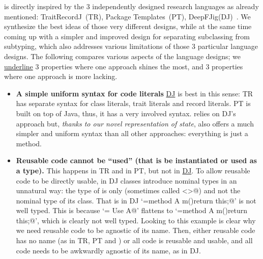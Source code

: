\name is directly inspired by the 3 independently designed research languages as already mentioned:
 TraitRecordJ~(TR)\cite{Bettini:2010:ISP:1774088.1774530}, Package Templates~(PT)\cite{KrogdahlMS09}, DeepFJig(DJ)~\cite{deep}.
We synthesize
the best ideas of those very different designs, while at the same time 
coming up with a simpler and improved design for separating
subclassing from subtyping, which also addresses various limitations of those
3 particular language designs.
The following compares 
various aspects of the language designs;
we \underline{underline} 3 properties where one approach shines the most, and 3 properties where one approach is more lacking.
\begin{itemize}
\item {\bf A simple uniform syntax for code literals}
\underline{DJ} is best in this sense: TR has separate syntax for class literals, trait literals and record literals.
PT is built on top of Java, thus, it has a very
involved syntax.
\name relies on DJ's approach but,
\emph{thanks to our novel representation of state}, \name also offers a much simpler and uniform syntax than
all other approaches: everything is just a method.
\item 
{\bf Reusable code cannot be ``used'' (that is be instantiated or used as a type).}
This happens in TR and in PT, but not in \underline{DJ}. To allow reusable code to be directly 
usable, in DJ
classes introduce nominal types in an unnatural way: the type of
\Q@this@ is only \Q@This@ (sometimes called \Q@<>@) and not the
nominal type of its class. 
That is in DJ 
`\Q@A={method A m(){return this;}}@' is not well typed. This is because
`\Q@B= Use A@' flattens to `\Q@B={method A m(){return this;}}@', which is clearly not well typed.
Looking to this example is clear why we need reusable code to be agnostic of its name.
Then, either reusable code has no name (as in TR, PT and \name)
or all code is reusable and usable, and all code needs to be awkwardly agnostic of its name, as in DJ.


\end{itemize}

